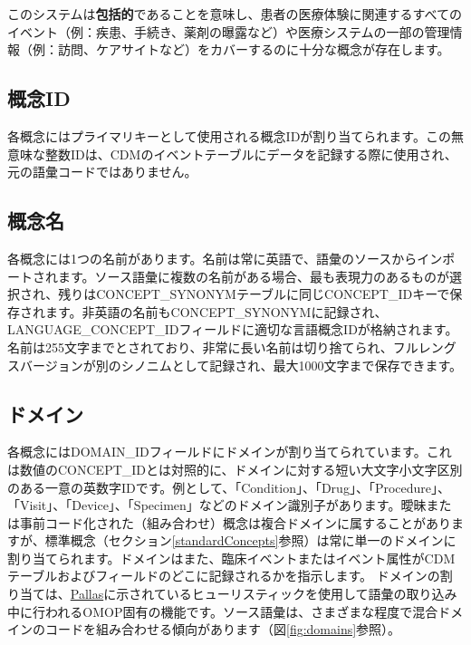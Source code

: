 \documentclass[
  11pt]{book}
\theoremstyle{definition}
\theoremstyle{definition}
\theoremstyle{definition}
\theoremstyle{definition}
\theoremstyle{remark}
\begin{document}
このシステムは\textbf{包括的}であることを意味し、患者の医療体験に関連するすべてのイベント（例：疾患、手続き、薬剤の曝露など）や医療システムの一部の管理情報（例：訪問、ケアサイトなど）をカバーするのに十分な概念が存在します。

\subsection{概念ID}\label{ux6982ux5ff5id}

各概念にはプライマリキーとして使用される概念IDが割り当てられます。この無意味な整数IDは、CDMのイベントテーブルにデータを記録する際に使用され、元の語彙コードではありません。 

\subsection{概念名}\label{ux6982ux5ff5ux540d}

各概念には1つの名前があります。名前は常に英語で、語彙のソースからインポートされます。ソース語彙に複数の名前がある場合、最も表現力のあるものが選択され、残りはCONCEPT\_SYNONYMテーブルに同じCONCEPT\_IDキーで保存されます。非英語の名前もCONCEPT\_SYNONYMに記録され、LANGUAGE\_CONCEPT\_IDフィールドに適切な言語概念IDが格納されます。名前は255文字までとされており、非常に長い名前は切り捨てられ、フルレングスバージョンが別のシノニムとして記録され、最大1000文字まで保存できます。

\subsection{ドメイン}\label{conceptDomains}

各概念にはDOMAIN\_IDフィールドにドメインが割り当てられています。これは数値のCONCEPT\_IDとは対照的に、ドメインに対する短い大文字小文字区別のある一意の英数字IDです。例として、「Condition」、「Drug」、「Procedure」、「Visit」、「Device」、「Specimen」などのドメイン識別子があります。曖昧または事前コード化された（組み合わせ）概念は複合ドメインに属することがありますが、標準概念（セクション\ref{standardConcepts}参照）は常に単一のドメインに割り当てられます。ドメインはまた、臨床イベントまたはイベント属性がCDMテーブルおよびフィールドのどこに記録されるかを指示します。
ドメインの割り当ては、\href{https://github.com/ohDSI/vocabulary-v5.0}{Pallas}に示されているヒューリスティックを使用して語彙の取り込み中に行われるOMOP固有の機能です。ソース語彙は、さまざまな程度で混合ドメインのコードを組み合わせる傾向があります（図\ref{fig:domains}参照）。
\end{document}
